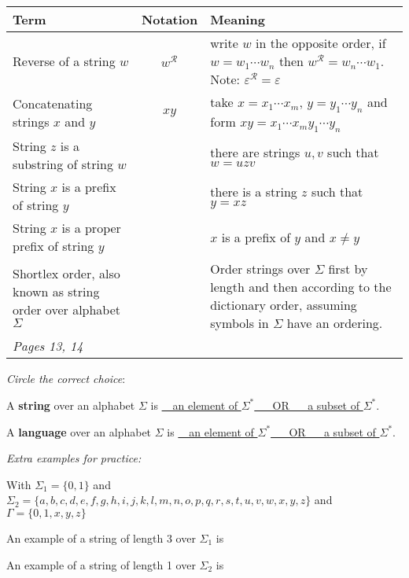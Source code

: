 \documentclass[12pt, oneside]{article}
\begin{document}
\begin{center}
    \begin{tabular}{|p{2.7in}cp{3.8in}|}
    \hline
    Term & Notation & Meaning \\
    \hline \hline
    Reverse of a string $w$ & $w^\mathcal{R}$  & write $w$  in  the opposite order, if $w = w_1 \cdots  w_n$ then $w^\mathcal{R} = w_n \cdots  w_1$. Note: $\varepsilon^\mathcal{R} = \varepsilon$\\ \hline
    Concatenating strings $x$ and $y$ & $xy$ &  take $x = x_1 \cdots x_m$, $y=y_1 \cdots y_n$ and form $xy = x_1 \cdots x_m y_1 \cdots y_n$\\ \hline
    String $z$ is a substring of string $w$ & & there are strings $u,v$ such that $w = uzv$\\ \hline
    String $x$ is a prefix of string $y$ & & there is a string $z$ such that $y = xz$ \\ \hline
    String $x$ is a proper prefix of string $y$ & & $x$ is a prefix of $y$ and $x \neq y$\\ \hline
    Shortlex order, also known as string order over alphabet $\Sigma$ & & Order strings over  $\Sigma$ first by length and then according to the dictionary order, assuming symbols in $\Sigma$  have an ordering.\\ \hline
    \hline \hline
    {\it Pages 13, 14} & & \\
    \hline
    \end{tabular}
\end{center}

    

{\it Circle the correct choice}:

A {\bf string} over an alphabet $\Sigma$ is \underline{~~an element of $\Sigma^*$ ~~ OR ~~ a subset of $\Sigma^*$}.
    
A {\bf language} over an alphabet $\Sigma$ is \underline{~~an element of $\Sigma^*$ ~~ OR ~~ a subset of $\Sigma^*$}.


{\it Extra examples for practice:}

With $\Sigma_1 = \{0,1\}$ and $\Sigma_2 = \{a,b,c,d,e,f,g,h,i,j,k,l,m,n,o,p,q,r,s,t,u,v,w,x,y,z\}$  and $\Gamma = \{0,1,x,y,z\}$

An example of a string of length 3 over $\Sigma_1$ is \underline{\phantom{ $000$} \hspace{0.2in}}

An example of  a string of length 1 over $\Sigma_2$ is  \underline{\phantom{ $k$} \hspace{0.2in}}
\end{document}
